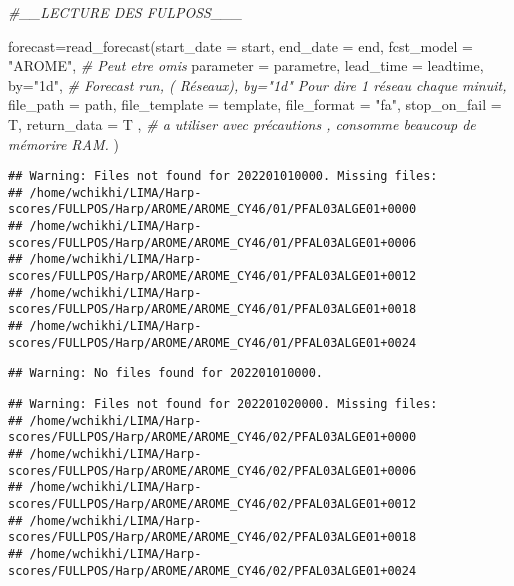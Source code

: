 \documentclass[
]{article}
\newenvironment{Shaded}{\begin{snugshade}}{\end{snugshade}}
\newcommand{\AttributeTok}[1]{\textcolor[rgb]{0.77,0.63,0.00}{#1}}
\newcommand{\CommentTok}[1]{\textcolor[rgb]{0.56,0.35,0.01}{\textit{#1}}}
\newcommand{\FunctionTok}[1]{\textcolor[rgb]{0.00,0.00,0.00}{#1}}
\newcommand{\NormalTok}[1]{#1}
\newcommand{\OtherTok}[1]{\textcolor[rgb]{0.56,0.35,0.01}{#1}}
\newcommand{\StringTok}[1]{\textcolor[rgb]{0.31,0.60,0.02}{#1}}
\begin{document}
\begin{Shaded}
\begin{Highlighting}[]
\CommentTok{\#\_\_LECTURE DES FULPOSS\_\_\_}

\NormalTok{forecast}\OtherTok{=}\FunctionTok{read\_forecast}\NormalTok{(}\AttributeTok{start\_date =}\NormalTok{ start,}
              \AttributeTok{end\_date =}\NormalTok{ end,}
              \AttributeTok{fcst\_model =} \StringTok{"AROME"}\NormalTok{,  }\CommentTok{\# Peut etre omis }
              \AttributeTok{parameter =}\NormalTok{ parametre,}
              \AttributeTok{lead\_time =}\NormalTok{ leadtime,}
              \AttributeTok{by=}\StringTok{"1d"}\NormalTok{,     }\CommentTok{\#  Forecast run, ( Réseaux), by="1d" Pour dire 1 réseau chaque minuit, }
              \AttributeTok{file\_path =}\NormalTok{ path,}
              \AttributeTok{file\_template =}\NormalTok{ template,}
              \AttributeTok{file\_format =} \StringTok{"fa"}\NormalTok{,}
              \AttributeTok{stop\_on\_fail =}\NormalTok{  T,}
              \AttributeTok{return\_data =}\NormalTok{ T , }\CommentTok{\# a utiliser avec précautions , consomme beaucoup de mémorire RAM.}
\NormalTok{              )}
\end{Highlighting}
\end{Shaded}

\begin{verbatim}
## Warning: Files not found for 202201010000. Missing files:
## /home/wchikhi/LIMA/Harp-scores/FULLPOS/Harp/AROME/AROME_CY46/01/PFAL03ALGE01+0000
## /home/wchikhi/LIMA/Harp-scores/FULLPOS/Harp/AROME/AROME_CY46/01/PFAL03ALGE01+0006
## /home/wchikhi/LIMA/Harp-scores/FULLPOS/Harp/AROME/AROME_CY46/01/PFAL03ALGE01+0012
## /home/wchikhi/LIMA/Harp-scores/FULLPOS/Harp/AROME/AROME_CY46/01/PFAL03ALGE01+0018
## /home/wchikhi/LIMA/Harp-scores/FULLPOS/Harp/AROME/AROME_CY46/01/PFAL03ALGE01+0024
\end{verbatim}

\begin{verbatim}
## Warning: No files found for 202201010000.
\end{verbatim}

\begin{verbatim}
## Warning: Files not found for 202201020000. Missing files:
## /home/wchikhi/LIMA/Harp-scores/FULLPOS/Harp/AROME/AROME_CY46/02/PFAL03ALGE01+0000
## /home/wchikhi/LIMA/Harp-scores/FULLPOS/Harp/AROME/AROME_CY46/02/PFAL03ALGE01+0006
## /home/wchikhi/LIMA/Harp-scores/FULLPOS/Harp/AROME/AROME_CY46/02/PFAL03ALGE01+0012
## /home/wchikhi/LIMA/Harp-scores/FULLPOS/Harp/AROME/AROME_CY46/02/PFAL03ALGE01+0018
## /home/wchikhi/LIMA/Harp-scores/FULLPOS/Harp/AROME/AROME_CY46/02/PFAL03ALGE01+0024
\end{verbatim}
\end{document}
